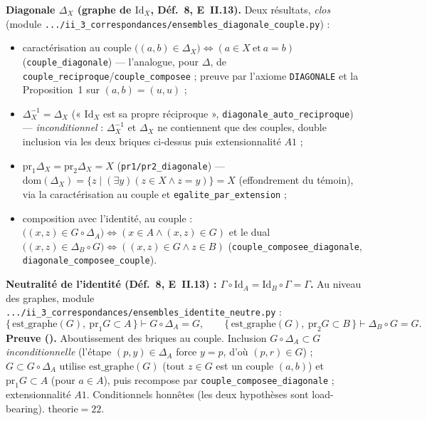 \textbf{Diagonale $\Delta_X$ (graphe de $\mathrm{Id}_X$, Déf.~8, E~II.13).} Deux résultats,
\emph{clos} (module \texttt{.../ii\_3\_correspondances/ensembles\_diagonale\_couple.py}) :
\begin{itemize}
  \item caractérisation au couple $\bigl((a,b)\in\Delta_X\bigr)\Leftrightarrow
        (a\in X\ \text{et}\ a=b)$ (\texttt{couple\_diagonale}) --- l'analogue, pour
        $\Delta$, de \texttt{couple\_reciproque}/\texttt{couple\_composee} ; preuve
        par l'axiome \texttt{DIAGONALE} et la Proposition~1 sur $(a,b)=(u,u)$ ;
  \item $\Delta_X^{-1}=\Delta_X$ (« $\mathrm{Id}_X$ est sa propre réciproque »,
        \texttt{diagonale\_auto\_reciproque}) --- \emph{inconditionnel} : $\Delta_X^{-1}$
        et $\Delta_X$ ne contiennent que des couples, double inclusion via les deux
        briques ci-dessus puis extensionnalité $A1$ ;
  \item $\mathrm{pr}_1\Delta_X=\mathrm{pr}_2\Delta_X=X$ (\texttt{pr1/pr2\_diagonale}) ---
        $\mathrm{dom}(\Delta_X)=\{z\mid(\exists y)(z\in X\wedge z=y)\}=X$ (effondrement
        du témoin), via la caractérisation au couple et \texttt{egalite\_par\_extension} ;
  \item composition avec l'identité, au couple :
        $\bigl((x,z)\in G\circ\Delta_A\bigr)\Leftrightarrow(x\in A\wedge(x,z)\in G)$ et le
        dual $\bigl((x,z)\in\Delta_B\circ G\bigr)\Leftrightarrow((x,z)\in G\wedge z\in B)$
        (\texttt{couple\_composee\_diagonale}, \texttt{diagonale\_composee\_couple}).
\end{itemize}

\textbf{Neutralité de l'identité (Déf.~8, E~II.13) : $\Gamma\circ\mathrm{Id}_A=
\mathrm{Id}_B\circ\Gamma=\Gamma$.} Au niveau des graphes, module
\texttt{.../ii\_3\_correspondances/ensembles\_identite\_neutre.py} :
\[
  \{\,\mathrm{est\_graphe}(G),\ \mathrm{pr}_1G\subset A\,\}\vdash G\circ\Delta_A=G,
  \qquad
  \{\,\mathrm{est\_graphe}(G),\ \mathrm{pr}_2G\subset B\,\}\vdash \Delta_B\circ G=G.
\]
\textbf{Preuve (\Nstar).} Aboutissement des briques au couple. Inclusion
$G\circ\Delta_A\subset G$ \emph{inconditionnelle} (l'étape $(p,y)\in\Delta_A$ force
$y=p$, d'où $(p,r)\in G$) ; $G\subset G\circ\Delta_A$ utilise $\mathrm{est\_graphe}(G)$
(tout $z\in G$ est un couple $(a,b)$) et $\mathrm{pr}_1G\subset A$ (pour $a\in A$),
puis recompose par \texttt{couple\_composee\_diagonale} ; extensionnalité $A1$.
Conditionnels honnêtes (les deux hypothèses sont load-bearing). $\mathrm{theorie}=22$.
